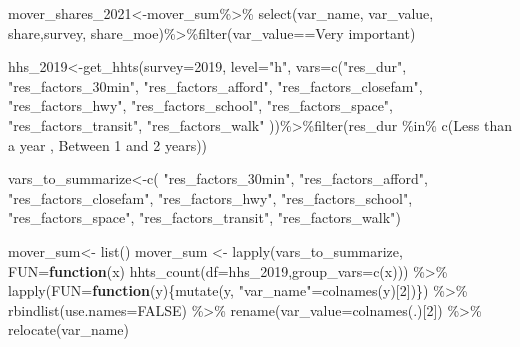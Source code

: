\documentclass[
]{article}
\newenvironment{Shaded}{\begin{snugshade}}{\end{snugshade}}
\newcommand{\AttributeTok}[1]{\textcolor[rgb]{0.77,0.63,0.00}{#1}}
\newcommand{\ConstantTok}[1]{\textcolor[rgb]{0.00,0.00,0.00}{#1}}
\newcommand{\ControlFlowTok}[1]{\textcolor[rgb]{0.13,0.29,0.53}{\textbf{#1}}}
\newcommand{\DecValTok}[1]{\textcolor[rgb]{0.00,0.00,0.81}{#1}}
\newcommand{\FunctionTok}[1]{\textcolor[rgb]{0.00,0.00,0.00}{#1}}
\newcommand{\NormalTok}[1]{#1}
\newcommand{\OtherTok}[1]{\textcolor[rgb]{0.56,0.35,0.01}{#1}}
\newcommand{\SpecialCharTok}[1]{\textcolor[rgb]{0.00,0.00,0.00}{#1}}
\newcommand{\StringTok}[1]{\textcolor[rgb]{0.31,0.60,0.02}{#1}}
\begin{document}
\begin{Shaded}
\begin{Highlighting}[]
\NormalTok{mover\_shares\_2021}\OtherTok{\textless{}{-}}\NormalTok{mover\_sum}\SpecialCharTok{\%\textgreater{}\%} \FunctionTok{select}\NormalTok{(var\_name, var\_value, share,survey, share\_moe)}\SpecialCharTok{\%\textgreater{}\%}\FunctionTok{filter}\NormalTok{(var\_value}\SpecialCharTok{==}\StringTok{\textquotesingle{}Very important\textquotesingle{}}\NormalTok{)}
\end{Highlighting}
\end{Shaded}

\begin{Shaded}
\begin{Highlighting}[]
\NormalTok{hhs\_2019}\OtherTok{\textless{}{-}}\FunctionTok{get\_hhts}\NormalTok{(}\AttributeTok{survey=}\StringTok{\textquotesingle{}2019\textquotesingle{}}\NormalTok{, }\AttributeTok{level=}\StringTok{"h"}\NormalTok{, }\AttributeTok{vars=}\FunctionTok{c}\NormalTok{(}\StringTok{"res\_dur"}\NormalTok{,}
\StringTok{"res\_factors\_30min"}\NormalTok{,}
\StringTok{"res\_factors\_afford"}\NormalTok{,}
\StringTok{"res\_factors\_closefam"}\NormalTok{,}
\StringTok{"res\_factors\_hwy"}\NormalTok{,}
\StringTok{"res\_factors\_school"}\NormalTok{,}
\StringTok{"res\_factors\_space"}\NormalTok{,}
\StringTok{"res\_factors\_transit"}\NormalTok{,}
\StringTok{"res\_factors\_walk"}
\NormalTok{))}\SpecialCharTok{\%\textgreater{}\%}\FunctionTok{filter}\NormalTok{(res\_dur }\SpecialCharTok{\%in\%} \FunctionTok{c}\NormalTok{(}\StringTok{\textquotesingle{}Less than a year\textquotesingle{}}\NormalTok{ , }\StringTok{\textquotesingle{}Between 1 and 2 years\textquotesingle{}}\NormalTok{))}



\NormalTok{vars\_to\_summarize}\OtherTok{\textless{}{-}}\FunctionTok{c}\NormalTok{(}
\StringTok{"res\_factors\_30min"}\NormalTok{,}
\StringTok{"res\_factors\_afford"}\NormalTok{,}
\StringTok{"res\_factors\_closefam"}\NormalTok{,}
\StringTok{"res\_factors\_hwy"}\NormalTok{,}
\StringTok{"res\_factors\_school"}\NormalTok{,}
\StringTok{"res\_factors\_space"}\NormalTok{,}
\StringTok{"res\_factors\_transit"}\NormalTok{,}
\StringTok{"res\_factors\_walk"}\NormalTok{)}



\NormalTok{mover\_sum}\OtherTok{\textless{}{-}} \FunctionTok{list}\NormalTok{()}
\NormalTok{mover\_sum }\OtherTok{\textless{}{-}} \FunctionTok{lapply}\NormalTok{(vars\_to\_summarize, }\AttributeTok{FUN=}\ControlFlowTok{function}\NormalTok{(x) }\FunctionTok{hhts\_count}\NormalTok{(}\AttributeTok{df=}\NormalTok{hhs\_2019,}\AttributeTok{group\_vars=}\FunctionTok{c}\NormalTok{(x))) }\SpecialCharTok{\%\textgreater{}\%}
    \FunctionTok{lapply}\NormalTok{(}\AttributeTok{FUN=}\ControlFlowTok{function}\NormalTok{(y)\{}\FunctionTok{mutate}\NormalTok{(y, }\StringTok{"var\_name"}\OtherTok{=}\FunctionTok{colnames}\NormalTok{(y)[}\DecValTok{2}\NormalTok{])\}) }\SpecialCharTok{\%\textgreater{}\%} \FunctionTok{rbindlist}\NormalTok{(}\AttributeTok{use.names=}\ConstantTok{FALSE}\NormalTok{) }\SpecialCharTok{\%\textgreater{}\%} 
    \FunctionTok{rename}\NormalTok{(}\AttributeTok{var\_value=}\FunctionTok{colnames}\NormalTok{(.)[}\DecValTok{2}\NormalTok{]) }\SpecialCharTok{\%\textgreater{}\%} \FunctionTok{relocate}\NormalTok{(var\_name)}


\end{Highlighting}
\end{Shaded}
\end{document}
